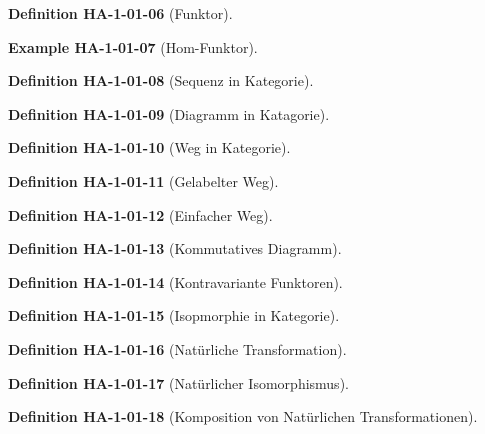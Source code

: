 \documentclass[10pt, letterpaper]{article}
\newcommand{\CustomHeading}[3]{%
  \par\medskip\noindent%
  \textbf{#1 #2} \textnormal{(#3)}.\enskip%
}
\newenvironment{DEF}[2]{\CustomHeading{Definition}{#1}{#2}}{}
\newenvironment{EXA}[2]{\CustomHeading{Example}{#1}{#2}}{}
\begin{document}
\begin{DEF}{HA-1-01-06}{Funktor}
\end{DEF}

\begin{EXA}{HA-1-01-07}{Hom-Funktor}
\end{EXA}

\begin{DEF}{HA-1-01-08}{Sequenz in Kategorie}
\end{DEF}

\begin{DEF}{HA-1-01-09}{Diagramm in Katagorie}
\end{DEF}

\begin{DEF}{HA-1-01-10}{Weg in Kategorie}
\end{DEF}

\begin{DEF}{HA-1-01-11}{Gelabelter Weg}
\end{DEF}

\begin{DEF}{HA-1-01-12}{Einfacher Weg}
\end{DEF}

\begin{DEF}{HA-1-01-13}{Kommutatives Diagramm}
\end{DEF}

\begin{DEF}{HA-1-01-14}{Kontravariante Funktoren}
\end{DEF}

\begin{DEF}{HA-1-01-15}{Isopmorphie in Kategorie}
\end{DEF}

\begin{DEF}{HA-1-01-16}{Natürliche Transformation}
\end{DEF}

\begin{DEF}{HA-1-01-17}{Natürlicher Isomorphismus}
\end{DEF}

\begin{DEF}{HA-1-01-18}{Komposition von Natürlichen Transformationen}
\end{DEF}
\end{document}

